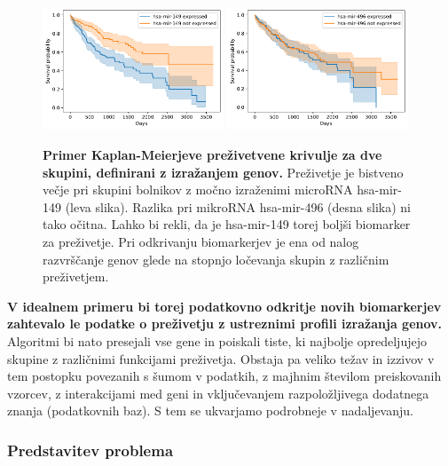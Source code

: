 \documentclass[11pt,a4paper]{article}
\renewcommand{\bold}{\textbf}
\begin{document}
\begin{figure}
\includegraphics[width=0.48\textwidth]{hsa-mir-149}\hfill
\includegraphics[width=0.48\textwidth]{hsa-mir-496}
\caption{\small\bold{Primer Kaplan-Meierjeve preživetvene krivulje za dve skupini, definirani z izražanjem genov.} Preživetje je bistveno večje pri skupini bolnikov z močno izraženimi
microRNA hsa-mir-149 (leva slika). Razlika pri mikroRNA hsa-mir-496 (desna slika) ni tako očitna. Lahko bi rekli, da je hsa-mir-149 torej boljši biomarker za preživetje. Pri odkrivanju biomarkerjev je ena od nalog razvrščanje genov glede na stopnjo ločevanja skupin z različnim preživetjem.}
\label{fig:km-marker}
\end{figure}

\bold{V idealnem primeru bi torej podatkovno odkritje novih biomarkerjev zahtevalo le podatke o preživetju z ustreznimi profili izražanja genov.} Algoritmi bi nato presejali vse gene in poiskali tiste, ki najbolje opredeljujejo skupine z različnimi funkcijami preživetja. Obstaja pa veliko težav in izzivov v tem postopku povezanih s šumom v podatkih, z majhnim številom preiskovanih vzorcev, z interakcijami med geni in vključevanjem razpoložljivega dodatnega znanja (podatkovnih baz). S tem se ukvarjamo podrobneje v nadaljevanju.

\subsubsection*{Predstavitev problema}
\end{document}
